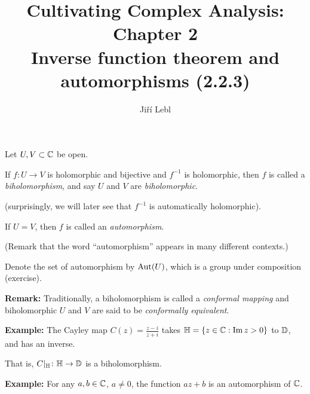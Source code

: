 \documentclass[10pt,aspectratio=169]{beamer}
\author{Ji\v{r}\'i Lebl}
\institute[OSU]{%
Departemento pri Matematiko de Oklahoma {\^S}tata Universitato}
\title{Cultivating Complex Analysis: Chapter 2\\%
Inverse function theorem and automorphisms (2.2.3)}
\date{}
\begin{document}
\begin{frame}
\titlepage
\end{frame}

\begin{frame}
Let $U, V \subset {\mathbb{C}}$ be open.

\medskip
\pause

If $f \colon U \to V$ is holomorphic and bijective and
$f^{-1}$ is holomorphic, then $f$ is 
called a \emph{biholomorphism}, and say $U$ and $V$
are \emph{biholomorphic}.

\pause
(surprisingly, we will later see that $f^{-1}$ is automatically holomorphic).

\medskip
\pause

If $U = V$, then $f$ is called an \emph{automorphism}.

\pause
(Remark that the word ``automorphism'' appears in many different contexts.)

\medskip
\pause

Denote the set of automorphism by $\operatorname{Aut}(U)$, which is a group under
composition (exercise).

\medskip
\pause

\textbf{Remark:} Traditionally, a biholomorphism is called a
\emph{conformal mapping} and biholomorphic $U$ and $V$ are said to be
\emph{conformally equivalent}.

\medskip
\pause

\textbf{Example:}
The Cayley map
$C(z)
=
\frac{z - i}{z + i}$
takes ${\mathbb{H}} = \{ z \in {\mathbb{C}} : \operatorname{Im} z > 0 \}$ to ${\mathbb{D}}$, and has an inverse.

That is, $C|_{{\mathbb{H}}} \colon {\mathbb{H}} \to {\mathbb{D}}$ is a biholomorphism.

\medskip
\pause

\textbf{Example:}
For any $a,b \in {\mathbb{C}}$, $a \not= 0$, the function $a z + b$ is an automorphism of ${\mathbb{C}}$.
\end{frame}
\end{document}
